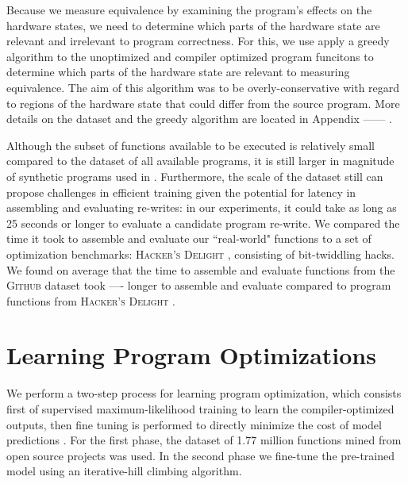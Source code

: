 \documentclass{article}
\newcommand{\GH}{\textsc{Github}}
\begin{document}
Because we measure equivalence by examining the program's effects on the hardware states, we need to determine which parts of the hardware state are relevant and irrelevant to program correctness. For this, we use apply a greedy algorithm to the unoptimized and compiler optimized program funcitons to determine which parts of the hardware state are relevant to measuring equivalence. The aim of this algorithm was to be overly-conservative with regard to regions of the hardware state that could differ from the source program. More details on the dataset and the greedy algorithm are located in Appendix ------ .


Although the subset of functions available to be executed is relatively small compared to the dataset of all available programs, it is still larger in magnitude of synthetic programs used in \cite{shi2020}. Furthermore, the scale of the dataset still can propose challenges in efficient training given the potential for latency in assembling and evaluating re-writes: in our experiments, it could take as long as 25 seconds or longer to evaluate a candidate program re-write. We compared the time it took to assemble and evaluate our ``real-world" functions to a set of optimization benchmarks: \textsc{Hacker's Delight} \cite{warren2013hacker}, consisting of bit-twiddling hacks. We found on average that the time to assemble and evaluate functions from the \GH{} dataset took ---- longer to assemble and evaluate compared to program functions from \textsc{Hacker's Delight} . 

\section{Learning Program Optimizations}

We perform a two-step process for learning program optimization, which consists first of supervised maximum-likelihood training to learn the compiler-optimized outputs, then fine tuning is performed to directly minimize the cost of model predictions .
For the first phase, the dataset of 1.77 million functions mined from open source projects was used. In the second phase we fine-tune the pre-trained model using an iterative-hill climbing algorithm. 
\end{document}
